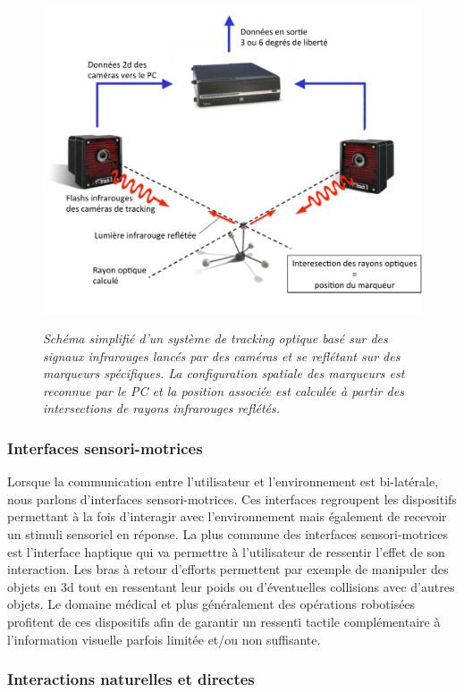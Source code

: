 \begin{figure}
  \centering
  {\includegraphics[width=.65\linewidth]{./figures/ch2/IR-tracking}}
    \caption{{\it Schéma simplifié d'un système de tracking optique basé sur des signaux infrarouges lancés par des caméras et se reflétant sur des marqueurs spécifiques. La configuration spatiale des marqueurs est reconnue par le PC et la position associée est calculée à partir des intersections de rayons infrarouges reflétés.}}
  \label{Fig:ir-tracking}
  \hspace{0.3cm}
\end{figure}

\subsubsection{Interfaces sensori-motrices} \label{interface_sensor-motor}

Lorsque la communication entre l'utilisateur et l'environnement est bi-latérale, nous parlons d'interfaces sensori-motrices. Ces interfaces regroupent les dispositifs permettant à la fois d'interagir avec l'environnement mais également de recevoir un stimuli sensoriel en réponse. La plus commune des interfaces sensori-motrices est l'interface haptique qui va permettre à l'utilisateur de ressentir l'effet de son interaction. Les bras à retour d'efforts permettent par exemple de manipuler des objets en 3d tout en ressentant leur poids ou d'éventuelles collisions avec d'autres objets. Le domaine médical et plus généralement des opérations robotisées profitent de ces dispositifs afin de garantir un ressenti tactile complémentaire à l'information visuelle parfois limitée et/ou non suffisante.

\subsubsection{Interactions naturelles et directes} \label{interface_nature}

